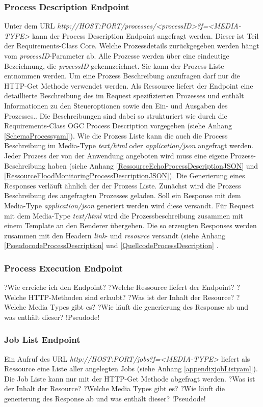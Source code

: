 \subsubsection{Process Description Endpoint}
Unter dem URL \textit{http://HOST:PORT/processes/<processID>?f=<MEDIA-TYPE>} kann der Process Description Endpoint angefragt werden. 
Dieser ist Teil der Requirements-Class Core. 
Welche Prozessdetails zurückgegeben werden hängt vom \textit{processID}-Parameter ab. Alle Prozesse werden über eine 
eindeutige Bezeichnung, die \textit{processID} gekennzeichnet. 
Sie kann der Prozess Liste entnommen werden. Um eine Prozess Beschreibung anzufragen darf nur die HTTP-Get Methode verwendet werden.   
Als Ressource liefert der Endpoint eine detaillierte Beschreibung des im Request spezifizierten Prozesses und enthält Informationen 
zu den Steueroptionen sowie den Ein- und Ausgaben des Prozesses.. 
Die Beschreibungen sind dabei so strukturiert wie durch die Requirements-Class OGC Process Description vorgegeben (siehe Anhang \ref{SchemaProcessyaml}). 
Wie die Prozess Liste kann die auch die Process Beschreibung im Media-Type \textit{text/html} oder \textit{application/json} angefragt werden.
Jeder Prozess der von der Anwendung angeboten wird muss eine eigene Prozess-Beschreibung haben (siehe Anhang \ref{RessourceEchoProcessDescriptionJSON} und 
\ref{RessourceFloodMonitoringProcessDescriptionJSON}).  
Die Generierung eines Responses verläuft ähnlich der der Prozess Liste. Zunächst wird die Prozess Beschreibung des angefragten Prozesses geladen. 
Soll ein Response mit dem Media-Type \textit{application/json} generiert werden wird diese versandt. 
Für Request mit dem Media-Type \textit{text/html} wird die Prozessbeschreibung zusammen mit einem Template an den Renderer übergeben. 
Die so erzeugten Responses werden zusammen mit den Headern \textit{link}- und \textit{resource} versandt (siehe Anhang \ref{PseudocodeProcessDescription} 
und \ref{QuellcodeProcessDescription} \cite{ogc_api_processes_core}.

\subsubsection{Process Execution Endpoint}
?Wie erreiche ich den Endpoint?
?Welche Ressource liefert der Endpoint?
?Welche HTTP-Methoden sind erlaubt?
?Was ist der Inhalt der Resource?
?Welche Media Types gibt es?
?Wie läuft die generierung des Response ab und was enthält dieser?
!Pseudode!

\subsubsection{Job List Endpoint}
Ein Aufruf des URL \textit{http://HOST:PORT/jobs?f=<MEDIA-TYPE>} liefert als Ressource eine Liste aller angelegten Jobs (siehe Anhang \ref{appendixjobListyaml}). 
Die Job Liste kann nur mit der HTTP-Get Methode abgefragt werden. 
?Was ist der Inhalt der Resource?
?Welche Media Types gibt es?
?Wie läuft die generierung des Response ab und was enthält dieser?
!Pseudode!

